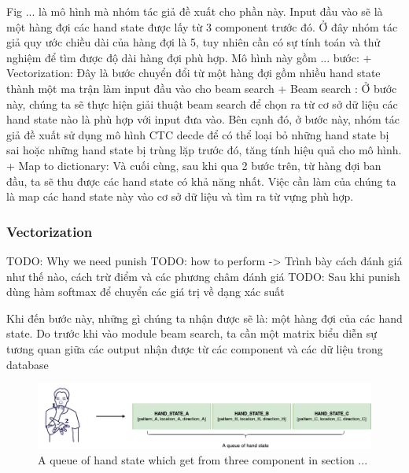       Fig ... là mô hình mà nhóm tác giả đề xuất cho phần này. Input đầu vào
      sẽ là một hàng đợi các hand state được lấy từ 3 component trước đó. Ở đây nhóm tác giả
      quy ước chiều dài của hàng đợi là 5, tuy nhiên cần có sự tính toán và thử nghiệm để tìm
      được độ dài hàng đợi phù hợp.
      Mô hình này gồm ... bước:
        + Vectorization: Đây là bước chuyển đổi từ một hàng đợi gồm nhiều hand state thành
        một ma trận làm input đầu vào cho beam search
        + Beam search : Ở bước này, chúng ta sẽ thực hiện giải thuật beam search để chọn ra
        từ cơ sở dữ liệu các hand state nào là phù hợp với input đưa vào. Bên cạnh đó, ở bước
        này, nhóm tác giả đề xuất sử dụng mô hình CTC decde để có thể loại bỏ những hand state bị sai
        hoặc những hand state bị trùng lặp trước đó, tăng tính hiệu quả cho mô hình.
        + Map to dictionary: Và cuối cùng, sau khi qua 2 bước trên, từ hàng đợi ban đầu, ta sẽ
        thu được các hand state có khả năng nhất. Việc cần làm của chúng ta là map các hand state
        này vào cơ sở dữ liệu và tìm ra từ vựng phù hợp.
      
    \subsubsection{ Vectorization }
      TODO: Why we need punish
      TODO: how to perform -> Trình bày cách đánh giá như thế nào, cách trừ điểm và các phương châm đánh giá
      TODO: Sau khi punish dùng hàm softmax để chuyển các giá trị về dạng xác suất

      Khi đến bước này, những gì chúng ta nhận được sẽ là: một hàng đợi của các hand state.
      Do trước khi vào module beam search, ta cần một matrix biểu diễn sự tương quan giữa các output nhận được từ các component và các dữ liệu trong database
      \begin{figure}[H]
        \centering
        \includegraphics[width=\textwidth]{img/Chap4/HandStateQueue.png}
        \caption{A queue of hand state which get from three component in section ... }
        \label{fig:Chap4-HandStateQueue}
      \end{figure}

